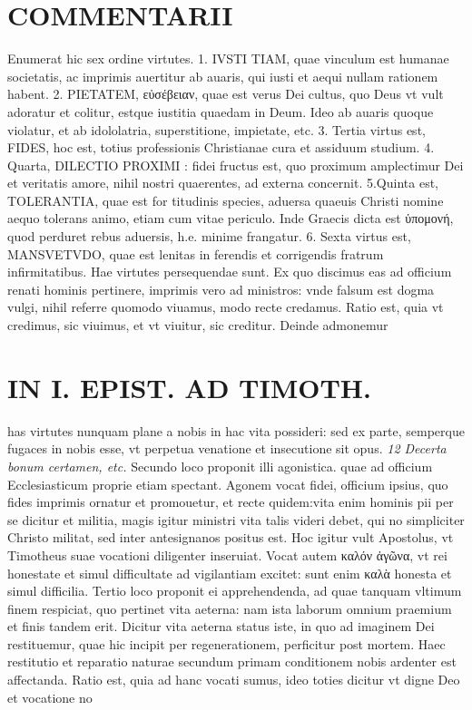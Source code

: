\documentclass{article}
\begin{document}
\begin{pages}
\section*{COMMENTARII }
\marginpar{[ p.160 ]}\pstart Enumerat hic sex ordine virtutes. 1. IVSTI TIAM, quae vinculum est humanae societatis, ac imprimis auertitur ab auaris, qui iusti et aequi nullam rationem habent. 2. PIETATEM, εὐσέβειαν, quae est verus Dei cultus, quo Deus vt vult adoratur et colitur, estque iustitia quaedam in Deum. Ideo ab auaris quoque violatur, et ab idololatria, superstitione, impietate, etc. 3. Tertia virtus est, FIDES, hoc est, totius professionis Christianae cura et assiduum studium. 4. Quarta, DILECTIO PROXIMI : fidei fructus est, quo proximum amplectimur Dei et veritatis amore, nihil nostri quaerentes, ad externa concernit. 5.Quinta est, TOLERANTIA, quae est for titudinis species, aduersa quaeuis Christi nomine aequo tolerans animo, etiam cum vitae periculo. Inde Graecis dicta est ὑπομονή, quod perduret rebus  aduersis, h.e. minime frangatur. 6. Sexta virtus est, MANSVETVDO, quae est lenitas in ferendis et corrigendis fratrum infirmitatibus. Hae virtutes persequendae sunt. Ex quo discimus eas ad officium renati hominis pertinere, imprimis vero ad ministros: vnde falsum est dogma vulgi, nihil referre quomodo viuamus, modo recte credamus.  \pend\pstart Ratio est, quia vt credimus, sic viuimus, et vt viuitur, sic creditur. Deinde admonemur  \pend
\section*{IN I. EPIST. AD TIMOTH. }
\marginpar{[ p.161 ]}\pstart has virtutes nunquam plane a nobis in hac vita possideri: sed ex parte, semperque fugaces in nobis esse, vt perpetua venatione et insecutione sit opus.  \pend
\textit{12 Decerta bonum certamen, etc. }\pstart Secundo loco proponit illi agonistica. quae ad officium Ecclesiasticum proprie etiam spectant. Agonem vocat fidei, officium ipsius, quo fides imprimis ornatur et promouetur, et recte quidem:vita enim hominis pii per se dicitur et militia, magis igitur ministri vita talis videri debet, qui no simpliciter Christo militat, sed inter antesignanos positus est. Hoc igitur vult Apostolus, vt Timotheus suae vocationi diligenter inseruiat. Vocat autem καλόν ἀγῶνα, vt rei honestate et simul difficultate ad vigilantiam excitet: sunt enim καλὰ honesta et simul difficilia.  \pend\pstart Tertio loco proponit ei apprehendenda, ad quae tanquam vltimum finem respiciat, quo pertinet vita aeterna: nam ista laborum omnium praemium et finis tandem erit. Dicitur vita aeterna status iste, in quo ad imaginem Dei restituemur, quae hic incipit per regenerationem, perficitur post mortem. Haec restitutio et reparatio naturae secundum primam conditionem nobis ardenter est affectanda. Ratio est, quia ad hanc vocati sumus, ideo toties dicitur vt digne Deo et vocatione no\pend

\end{pages}
\end{document}
